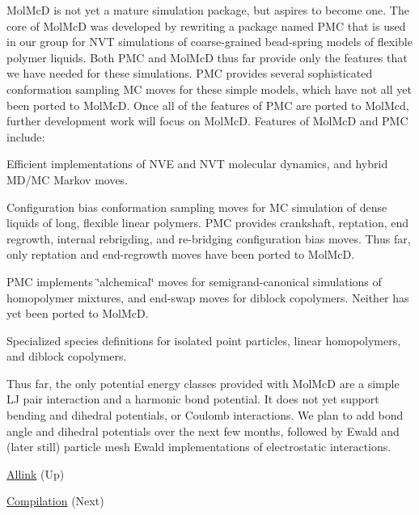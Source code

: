 Mol\+McD is not yet a mature simulation package, but aspires to become one. The core of Mol\+McD was developed by rewriting a package named P\+MC that is used in our group for N\+VT simulations of coarse-\/grained bead-\/spring models of flexible polymer liquids. Both P\+MC and Mol\+McD thus far provide only the features that we have needed for these simulations. P\+MC provides several sophisticated conformation sampling MC moves for these simple models, which have not all yet been ported to Mol\+McD. Once all of the features of P\+MC are ported to Mol\+Mcd, further development work will focus on Mol\+McD. Features of Mol\+McD and P\+MC include\+: 
\begin{DoxyItemize}
\item Efficient implementations of N\+VE and N\+VT molecular dynamics, and hybrid M\+D/\+MC Markov moves. 


\item Configuration bias conformation sampling moves for MC simulation of dense liquids of long, flexible linear polymers. P\+MC provides crankshaft, reptation, end regrowth, internal rebrigding, and re-\/bridging configuration bias moves. Thus far, only reptation and end-\/regrowth moves have been ported to Mol\+McD. 


\item P\+MC implements \char`\"{}alchemical\char`\"{} moves for semigrand-\/canonical simulations of homopolymer mixtures, and end-\/swap moves for diblock copolymers. Neither has yet been ported to Mol\+McD. 


\item Specialized species definitions for isolated point particles, linear homopolymers, and diblock copolymers. 


\end{DoxyItemize}Thus far, the only potential energy classes provided with Mol\+McD are a simple LJ pair interaction and a harmonic bond potential. It does not yet support bending and dihedral potentials, or Coulomb interactions. We plan to add bond angle and dihedral potentials over the next few months, followed by Ewald and (later still) particle mesh Ewald implementations of electrostatic interactions.


\begin{DoxyItemize}
\item \hyperlink{index}{Allink} (Up)  
\item \hyperlink{compile_page}{Compilation} (Next)  
\end{DoxyItemize}